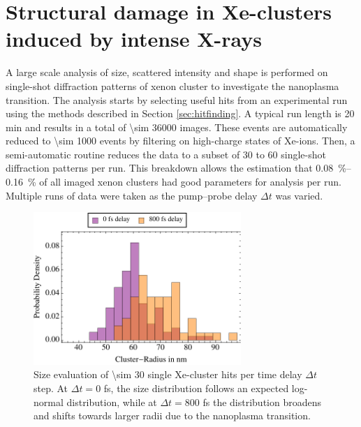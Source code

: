 \section{Structural damage in Xe-clusters induced by intense X-rays}\label{sec:xenon-data}
A large scale analysis of size, scattered intensity and shape is performed on single-shot diffraction patterns of xenon cluster to investigate the nanoplasma transition. The analysis starts by selecting useful hits from an experimental run using the methods described in Section \ref{sec:hitfinding}. A typical run length is 20 min and results in a total of \num{\sim 36000} images. These events are automatically reduced to \num{\sim 1000} events by filtering on high-charge states of Xe-ions. Then, a semi-automatic routine reduces the data to a subset of 30 to 60 single-shot diffraction patterns per run. This breakdown allows the estimation that \SIrange{0.08}{0.16}{\percent} of all imaged xenon clusters had good parameters for analysis per run. Multiple runs of data were taken as the pump--probe delay $\Delta t$ was varied.\\[1\baselineskip]
\begin{figure}
	\centering
		\includegraphics[width=0.70\textwidth]{images/size-distributions.pdf}
	\caption[Single Xe-cluster size distribution at varying time delay $\Delta t$.]{Size evaluation of \num{\sim 30} single Xe-cluster hits per time delay $\Delta t$ step. At $\Delta t=0$ fs, the size distribution follows an expected log-normal distribution, while at $\Delta t=800$ fs the distribution broadens and shifts towards larger radii due to the nanoplasma transition.}
	\label{fig:size-distributions}
\end{figure}
